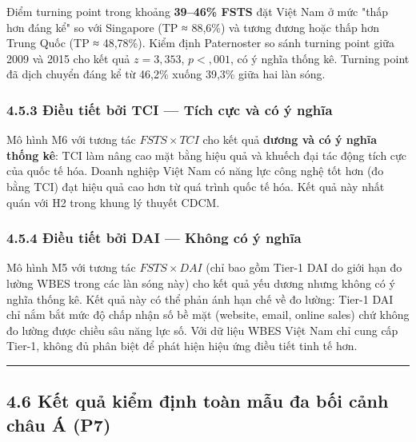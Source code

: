 \documentclass[12pt,a4paper]{article}
\begin{document}
Điểm turning point trong khoảng \textbf{39--46\% FSTS} đặt Việt Nam ở
mức "thấp hơn đáng kể" so với Singapore (TP ≈ 88,6\%) và tương đương
hoặc thấp hơn Trung Quốc (TP ≈ 48,78\%). Kiểm định Paternoster so sánh
turning point giữa 2009 và 2015 cho kết quả \(z = 3{,}353\),
\(p < {,}001\), có ý nghĩa thống kê. Turning point đã dịch chuyển đáng
kể từ 46,2\% xuống 39,3\% giữa hai làn sóng.

\hypertarget{453-ux111iux1ec1u-tiux1ebft-bux1edfi-tci--tuxedch-cux1ef1c-vuxe0-cuxf3-uxfd-nghux129a}{%
\subsubsection{4.5.3 Điều tiết bởi TCI --- Tích cực và có ý
nghĩa}\label{453-ux111iux1ec1u-tiux1ebft-bux1edfi-tci--tuxedch-cux1ef1c-vuxe0-cuxf3-uxfd-nghux129a}}

Mô hình M6 với tương tác \(FSTS \times TCI\) cho kết quả \textbf{dương
và có ý nghĩa thống kê}: TCI làm nâng cao mặt bằng hiệu quả và khuếch
đại tác động tích cực của quốc tế hóa. Doanh nghiệp Việt Nam có năng lực
công nghệ tốt hơn (đo bằng TCI) đạt hiệu quả cao hơn từ quá trình quốc
tế hóa. Kết quả này nhất quán với H2 trong khung lý thuyết CDCM.

\hypertarget{454-ux111iux1ec1u-tiux1ebft-bux1edfi-dai--khuxf4ng-cuxf3-uxfd-nghux129a}{%
\subsubsection{4.5.4 Điều tiết bởi DAI --- Không có ý
nghĩa}\label{454-ux111iux1ec1u-tiux1ebft-bux1edfi-dai--khuxf4ng-cuxf3-uxfd-nghux129a}}

Mô hình M5 với tương tác \(FSTS \times DAI\) (chỉ bao gồm Tier-1 DAI do
giới hạn đo lường WBES trong các làn sóng này) cho kết quả yếu dương
nhưng không có ý nghĩa thống kê. Kết quả này có thể phản ánh hạn chế về
đo lường: Tier-1 DAI chỉ nắm bắt mức độ chấp nhận số bề mặt (website,
email, online sales) chứ không đo lường được chiều sâu năng lực số. Với
dữ liệu WBES Việt Nam chỉ cung cấp Tier-1, không đủ phân biệt để phát
hiện hiệu ứng điều tiết tinh tế hơn.

\begin{center}\rule{0.5\linewidth}{0.5pt}\end{center}

\hypertarget{46-kux1ebft-quux1ea3-kiux1ec3m-ux111ux1ecbnh-touxe0n-mux1eabu-ux111a-bux1ed1i-cux1ea3nh-chuxe2u-uxe1-p7}{%
\subsection{4.6 Kết quả kiểm định toàn mẫu đa bối cảnh châu Á
(P7)}\label{46-kux1ebft-quux1ea3-kiux1ec3m-ux111ux1ecbnh-touxe0n-mux1eabu-ux111a-bux1ed1i-cux1ea3nh-chuxe2u-uxe1-p7}}
\end{document}
